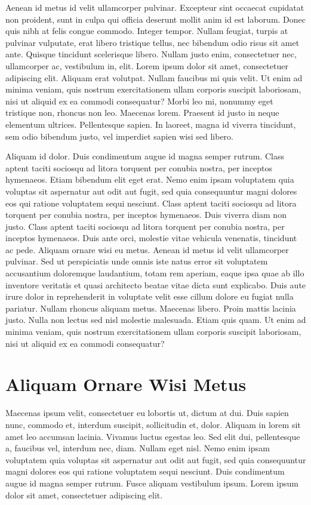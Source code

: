 Aenean id metus id velit ullamcorper pulvinar. Excepteur sint occaecat cupidatat non proident, sunt in culpa qui officia deserunt mollit anim id est laborum. Donec quis nibh at felis congue commodo. Integer tempor. Nullam feugiat, turpis at pulvinar vulputate, erat libero tristique tellus, nec bibendum odio risus sit amet ante. Quisque tincidunt scelerisque libero. Nullam justo enim, consectetuer nec, ullamcorper ac, vestibulum in, elit. Lorem ipsum dolor sit amet, consectetuer adipiscing elit. Aliquam erat volutpat. Nullam faucibus mi quis velit. Ut enim ad minima veniam, quis nostrum exercitationem ullam corporis suscipit laboriosam, nisi ut aliquid ex ea commodi consequatur? Morbi leo mi, nonummy eget tristique non, rhoncus non leo. Maecenas lorem. Praesent id justo in neque elementum ultrices. Pellentesque sapien. In laoreet, magna id viverra tincidunt, sem odio bibendum justo, vel imperdiet sapien wisi sed libero.

Aliquam id dolor. Duis condimentum augue id magna semper rutrum. Class aptent taciti sociosqu ad litora torquent per conubia nostra, per inceptos hymenaeos. Etiam bibendum elit eget erat. Nemo enim ipsam voluptatem quia voluptas sit aspernatur aut odit aut fugit, sed quia consequuntur magni dolores eos qui ratione voluptatem sequi nesciunt. Class aptent taciti sociosqu ad litora torquent per conubia nostra, per inceptos hymenaeos. Duis viverra diam non justo. Class aptent taciti sociosqu ad litora torquent per conubia nostra, per inceptos hymenaeos. Duis ante orci, molestie vitae vehicula venenatis, tincidunt ac pede. Aliquam ornare wisi eu metus. Aenean id metus id velit ullamcorper pulvinar. Sed ut perspiciatis unde omnis iste natus error sit voluptatem accusantium doloremque laudantium, totam rem aperiam, eaque ipsa quae ab illo inventore veritatis et quasi architecto beatae vitae dicta sunt explicabo. Duis aute irure dolor in reprehenderit in voluptate velit esse cillum dolore eu fugiat nulla pariatur. Nullam rhoncus aliquam metus. Maecenas libero. Proin mattis lacinia justo. Nulla non lectus sed nisl molestie malesuada. Etiam quis quam. Ut enim ad minima veniam, quis nostrum exercitationem ullam corporis suscipit laboriosam, nisi ut aliquid ex ea commodi consequatur?

\section{Aliquam Ornare Wisi Metus}
Maecenas ipsum velit, consectetuer eu lobortis ut, dictum at dui. Duis sapien nunc, commodo et, interdum suscipit, sollicitudin et, dolor. Aliquam in lorem sit amet leo accumsan lacinia. Vivamus luctus egestas leo. Sed elit dui, pellentesque a, faucibus vel, interdum nec, diam. Nullam eget nisl. Nemo enim ipsam voluptatem quia voluptas sit aspernatur aut odit aut fugit, sed quia consequuntur magni dolores eos qui ratione voluptatem sequi nesciunt. Duis condimentum augue id magna semper rutrum. Fusce aliquam vestibulum ipsum. Lorem ipsum dolor sit amet, consectetuer adipiscing elit.

